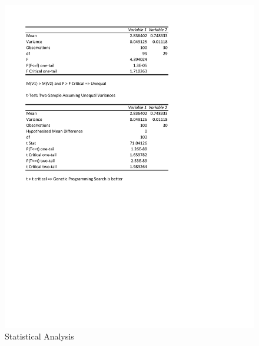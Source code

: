 \documentclass[times]{article}
\begin{document}
	\begin{figure}
		\caption{Statistical Analysis}
		\label{fig:stat}
		\includegraphics[width=\textwidth]{./pictures/test.pdf}
	\end{figure}


		
\end{document}
